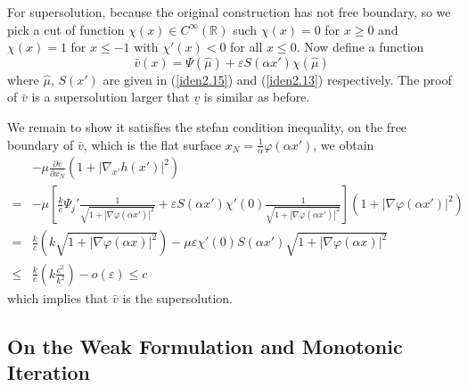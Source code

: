 \documentclass[12pt, a4paper]{article}
\numberwithin{equation}{section}
\newcommand{\R}{\mathbb{R}}
\newcommand{\pd}[2]{\frac{\partial #1}{\partial #2}}
\begin{document}
\begin{CJK}{UTF8}{bkai}
For supersolution, because the original construction has not free boundary, so we pick a cut of function $\chi(x)\in C^\infty(\R)$ such $\chi(x)=0$ for $x\geq 0$ and $\chi(x)=1$ for $x\leq -1$ with $\chi'(x)<0$ for all $x\leq 0$. Now define a function
\begin{equation}
	\bar{v}(x)=\Psi(\hat{\mu})+\varepsilon S(\alpha x')\chi(\hat{\mu})
\end{equation}
where $\hat{\mu}$, $S(x')$ are given in (\ref{iden2.15}) and (\ref{iden2.13}) respectively. The proof of $\bar{v}$ is a supersolution larger that $\underline{v}$ is similar as before.

We remain to show it satisfies the stefan condition inequality, on the free boundary of $\bar{v}$, which is the flat surface $x_N=\frac{1}{\alpha}\varphi(\alpha x')$, we obtain
\begin{align*}
	&-\mu\pd{\bar{v}}{x_N}(1+|\nabla_{x'} h(x')|^2)\\
		=&-\mu\left[\frac{k}{c}\Psi_j'\frac{1}{\sqrt{1+|\nabla\varphi(\alpha x')|^2}}+\varepsilon S(\alpha x')\chi'(0)\frac{1}{\sqrt{1+|\nabla \varphi(\alpha x')|^2}}\right](1+|\nabla\varphi(\alpha x')|^2)\\
		=&\frac{k}{c}(k\sqrt{1+|\nabla\varphi(\alpha x)|^2})-\mu\varepsilon\chi'(0)S(\alpha x')\sqrt{1+|\nabla\varphi(\alpha x)|^2}\\
		\leq& \frac{k}{c}(k\frac{c^2}{k^2})-o(\varepsilon)\leq c 
\end{align*}
which implies that $\bar{v}$ is the supersolution.




\subsection{On the Weak Formulation and Monotonic Iteration}


\end{CJK}
\end{document}
